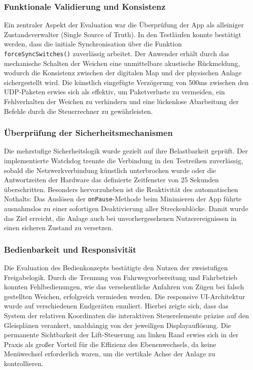 \documentclass{article}
\begin{document}
\subsubsection{Funktionale Validierung und Konsistenz}
Ein zentraler Aspekt der Evaluation war die Überprüfung der App als alleiniger Zustandsverwalter (Single Source of Truth).
In den Testläufen konnte bestätigt werden, dass die initiale Synchronisation über die Funktion \texttt{forceSyncSwitches()} zuverlässig arbeitet.
Der Anwender erhält durch das mechanische Schalten der Weichen eine unmittelbare akustische Rückmeldung, wodurch die Konsistenz zwischen der digitalen Map und der physischen Anlage sichergestellt wird.
Die künstlich eingefügte Verzögerung von 500ms zwischen den UDP‑Paketen erwies sich als effektiv, um Paketverluste zu vermeiden, ein Fehlverhalten der Weichen zu verhindern und eine lückenlose Abarbeitung der Befehle durch die Steuerrechner zu gewährleisten.

\subsubsection{Überprüfung der Sicherheitsmechanismen}
Die mehrstufige Sicherheitslogik wurde gezielt auf ihre Belastbarkeit geprüft.
Der implementierte Watchdog trennte die Verbindung in den Testreihen zuverlässig, sobald die Netzwerkverbindung künstlich unterbrochen wurde oder die Antwortzeiten der Hardware das definierte Zeitfenster von 25 Sekunden überschritten.
Besonders hervorzuheben ist die Reaktivität des automatischen Nothalts:
Das Auslösen der \texttt{onPause}-Methode beim Minimieren der App führte ausnahmslos zu einer sofortigen Deaktivierung aller Streckenblöcke.
Damit wurde das Ziel erreicht, die Anlage auch bei unvorhergesehenen Nutzerereignissen in einen sicheren Zustand zu versetzen.

\subsubsection{Bedienbarkeit und Responsivität}
Die Evaluation des Bedienkonzepts bestätigte den Nutzen der zweistufigen Freigabelogik.
Durch die Trennung von Fahrwegvorbereitung und Fahrbetrieb konnten Fehlbedienungen, wie das versehentliche Anfahren von Zügen bei falsch gestellten Weichen, erfolgreich vermieden werden.
Die responsive UI-Architektur wurde auf verschiedenen Endgeräten emuliert.
Hierbei zeigte sich, dass das System der relativen Koordinaten die interaktiven Steuerelemente präzise auf den Gleisplänen verankert, unabhängig von der jeweiligen Displayauflösung.
Die permanente Sichtbarkeit der Lift-Steuerung am linken Rand erwies sich in der Praxis als großer Vorteil für die Effizienz des Ebenenwechsels, da keine Menüwechsel erforderlich waren, um die vertikale Achse der Anlage zu kontrollieren.
\end{document}
